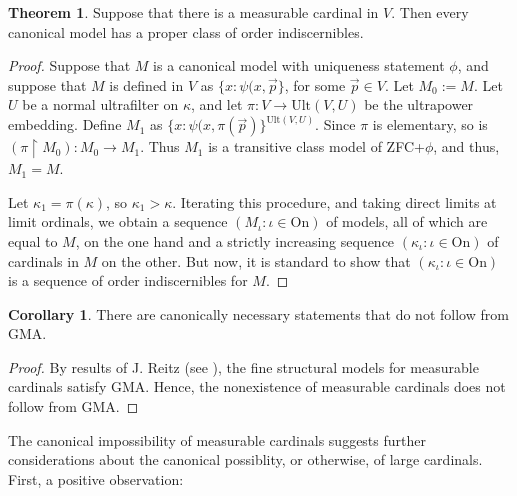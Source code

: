 \documentclass[a4paper,12pt]{amsart}
\theoremstyle{definition}
\newtheorem{thm}[fact]{Theorem}
\newtheorem{corollary}[fact]{Corollary}
\begin{document}
\begin{thm}
Suppose that there is a measurable cardinal in $V$. Then every canonical model has a 
proper class of 
order indiscernibles.
\end{thm}
\begin{proof} 
Suppose that $M$ is a canonical model with uniqueness statement $\phi$, and suppose that $M$ is defined in $V$ as $\{x:\psi(x,\vec{p}\}$, for some $\vec{p}\in V$. Let $M_{0}:=M$. 
Let $U$ be a normal ultrafilter on $\kappa$, and let $\pi:V\rightarrow\text{Ult}(V,U)$ be the ultrapower embedding. Define $M_1$ as $\{x:\psi(x,\pi(\vec{p})\}^{\text{Ult}(V,U)}$. 
Since $\pi$ is elementary, so is $(\pi\upharpoonright M_0):M_{0}\rightarrow M_{1}$. 
Thus $M_1$ is a transitive class model of ZFC+$\phi$, and thus, $M_{1}=M$. 

Let $\kappa_1=\pi(\kappa)$, so $\kappa_{1}>\kappa$. Iterating this procedure, and taking direct limits at limit ordinals, we obtain a sequence $(M_{\iota}:\iota\in\text{On})$ of models, all of which are equal to $M$, on the one hand and a strictly increasing sequence $(\kappa_{\iota}:\iota\in\text{On})$ of cardinals in $M$ on the other. But now, it is standard to show that $(\kappa_{\iota}:\iota\in\text{On})$ is a sequence of order indiscernibles for $M$.
\end{proof}



\begin{corollary}
 There are canonically necessary statements that do not follow from GMA.
\end{corollary}
\begin{proof}
 By results of J. Reitz (see \cite{R}), the fine structural models for measurable cardinals satisfy GMA. Hence, the nonexistence of measurable cardinals does not follow from GMA.
\end{proof}

The canonical impossibility of measurable cardinals suggests further considerations about the canonical possiblity, or otherwise,
of large cardinals. First, a positive observation:
\end{document}
